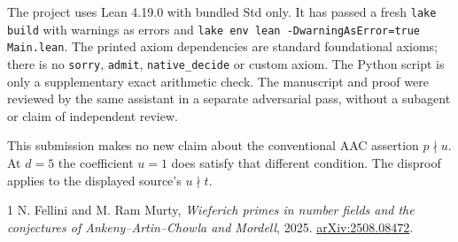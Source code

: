 \documentclass[11pt]{article}
\begin{document}
The project uses Lean 4.19.0 with bundled Std only. It has passed a fresh
\texttt{lake build} with warnings as errors and
\texttt{lake env lean -DwarningAsError=true Main.lean}.
The printed axiom dependencies are standard foundational axioms;
there is no \texttt{sorry}, \texttt{admit}, \texttt{native\_decide}
or custom axiom. The Python script is only a supplementary exact
arithmetic check. The manuscript and proof were reviewed by the
same assistant in a separate adversarial pass, without a subagent
or claim of independent review.

This submission makes no new claim about the conventional AAC assertion
$p\nmid u$. At $d=5$ the coefficient $u=1$ does satisfy that different
condition. The disproof applies to the displayed source's $u\nmid t$.

\begin{thebibliography}{1}
 N. Fellini and M. Ram Murty,
\emph{Wieferich primes in number fields and the conjectures of
Ankeny--Artin--Chowla and Mordell}, 2025.
\href{https://arxiv.org/abs/2508.08472}{arXiv:2508.08472}.
\end{thebibliography}
\end{document}
